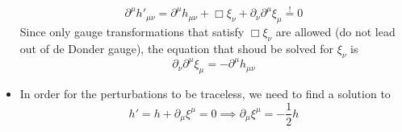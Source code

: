 \begin{itemize}
\begin{equation}
        \partial^\mu h'_{\mu\nu} = \partial^\mu h_{\mu\nu} + \Box \xi_\nu + \partial_\nu \partial^\mu \xi_\mu \overset{!}{=} 0
    \end{equation}
    Since only gauge transformations that satisfy $\Box \xi_\nu$ are allowed (do not lead out of de Donder gauge), the equation that shoud
    be solved for $\xi_\nu$ is
    \begin{equation}
        \partial_\nu \partial^\mu \xi_\mu = - \partial^\mu h_{\mu\nu}
    \end{equation}
    \item In order for the perturbations to be traceless, we need to find a solution to
    \begin{equation}
        h' = h + \partial_\mu \xi^\mu = 0 \implies \partial_\mu \xi^\mu =
        -\frac{1}{2}h
    \end{equation}
\end{itemize}
%
